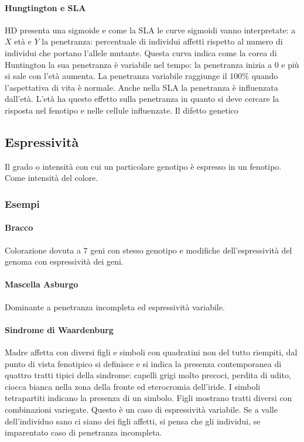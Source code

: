 \paragraph{Hungtington e SLA}
HD presenta una sigmoide e come la SLA le curve sigmoidi vanno interpretate: a $X$ et\`a e $Y$ la penetranza: percentuale di individui affetti rispetto al numero di individui che
portano l'allele mutante. Questa curva indica come la corea di Huntington la sua penetranza \`e variabile nel tempo: la penetranza inizia a $0$ e pi\`u si sale con l'et\`a aumenta. 
La penetranza variabile raggiunge il $100\%$ quando l'aspettativa di vita \`e normale. Anche nella SLA la penetranza \`e influenzata dall'et\`a. L'et\`a ha questo effetto sulla 
penetranza in quanto si deve cercare la risposta nel fenotipo e nelle cellule influenzate. Il difetto genetico 	
\subsection{Espressivit\`a}
Il grado o intensit\`a con cui un particolare genotipo \`e espresso in un fenotipo. Come intensit\`a del colore. 
\subsubsection{Esempi}
\paragraph{Bracco}
Colorazione dovuta a $7$ geni con stesso genotipo e modifiche dell'espressivit\`a del genoma con espressivit\`a dei geni.
\paragraph{Mascella Asburgo}
Dominante a penetranza incompleta ed espressivit\`a variabile.
\paragraph{Sindrome di Waardenburg}
Madre affetta con diversi figli e simboli con quadratini non del tutto riempiti, dal punto di vista fenotipico si definisce e si indica la presenza contemporanea di quattro tratti
tipici della sindrome: capelli grigi molto precoci, perdita di udito, ciocca bianca nella zona della fronte ed eterocromia dell'iride. I simboli tetrapartiti indicano la presenza di 
un simbolo. Figli mostrano tratti diversi con combinazioni variegate. Questo \`e un caso di espressivit\`a variabile. Se a valle dell'individuo sano ci siano dei figli affetti, si
pensa che gli individui, se imparentato caso di penetranza incompleta. 
